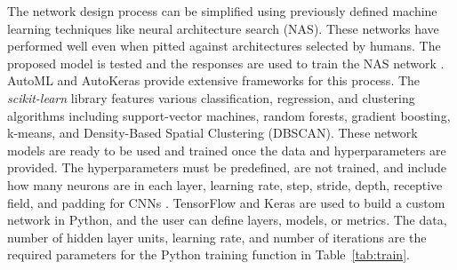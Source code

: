 \documentclass[preprint,12pt]{elsarticle}
\begin{document}
The network design process can be simplified using previously defined machine learning techniques like neural architecture search (NAS). These networks have performed well even when pitted against architectures selected by humans. The proposed model is tested and the responses are used to train the NAS network \cite{zoph2016neural}. AutoML and AutoKeras \cite{jin2019auto} provide extensive frameworks for this process. The \textit{scikit-learn} library features various classification, regression, and clustering algorithms including support-vector machines, random forests, gradient boosting, k-means, and Density-Based Spatial Clustering (DBSCAN). These network models are ready to be used and trained once the data and hyperparameters are provided. The hyperparameters must be predefined, are not trained, and include how many neurons are in each layer, learning rate, step, stride, depth, receptive field, and padding for CNNs \cite{claesen2015hyperparameter}. TensorFlow and Keras are used to build a custom network in Python, and the user can define layers, models, or metrics. The data, number of hidden layer units, learning rate, and number of iterations are the required parameters for the Python training function in Table~\ref{tab:train}.
\end{document}
